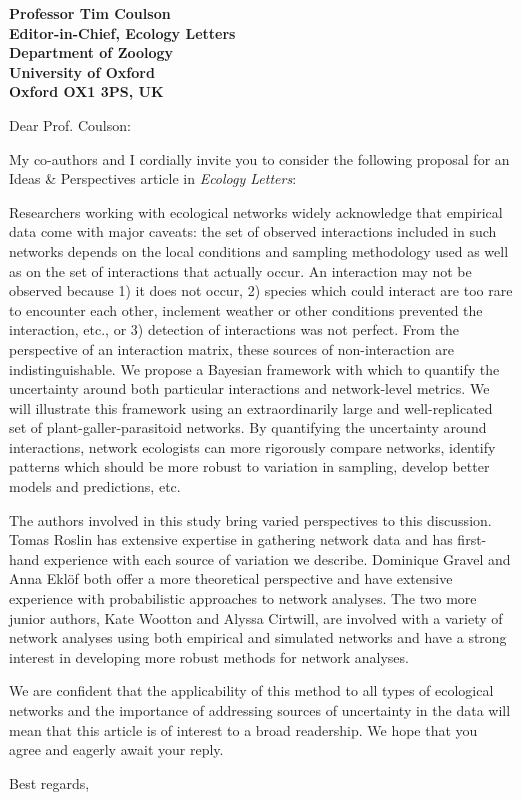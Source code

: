 \documentclass[12pt]{letter}
\newcommand{\myjournal}{\emph{Ecology Letters}}
\begin{document}
\begin{letter}{\bf Professor Tim Coulson\\
               Editor-in-Chief, Ecology Letters\\
               Department of Zoology\\
               University of Oxford\\
               Oxford OX1 3PS, UK
                               }


\opening{Dear Prof. Coulson:}

    My co-authors and I cordially invite you to consider the 
    following proposal for an Ideas \& Perspectives article in 
    \myjournal:



Researchers working with ecological networks widely acknowledge that empirical data come with major caveats: the set of observed interactions included in such networks depends on the local conditions and sampling methodology used as well as on the set of interactions that actually occur. An interaction may not be observed because 1) it does not occur, 2) species which could interact are too rare to encounter each other, inclement weather or other conditions prevented the interaction, etc., or 3) detection of interactions was not perfect. From the perspective of an interaction matrix, these sources of non-interaction are indistinguishable. We propose a Bayesian framework with which to quantify the uncertainty around both particular interactions and network-level metrics. We will illustrate this framework using an extraordinarily large and well-replicated set of plant-galler-parasitoid networks. By quantifying the uncertainty around interactions, network ecologists can more rigorously compare networks, identify patterns which should be more robust to variation in sampling, develop better models and predictions, etc.

The authors involved in this study bring varied perspectives to this discussion. Tomas Roslin has extensive expertise in gathering network data and has first-hand experience with each source of variation we describe. Dominique Gravel and Anna Ekl\"{o}f both offer a more theoretical perspective and have extensive experience with probabilistic approaches to network analyses. The two more junior authors, Kate Wootton and Alyssa Cirtwill, are involved with a variety of network analyses using both empirical and simulated networks and have a strong interest in developing more robust methods for network analyses.

We are confident that the applicability of this method to all types of ecological networks and the importance of addressing sources of uncertainty in the data will mean that this article is of interest to a broad readership. We hope that you agree and eagerly await your reply.



\closing{Best regards,}


\end{letter}
\end{document}
